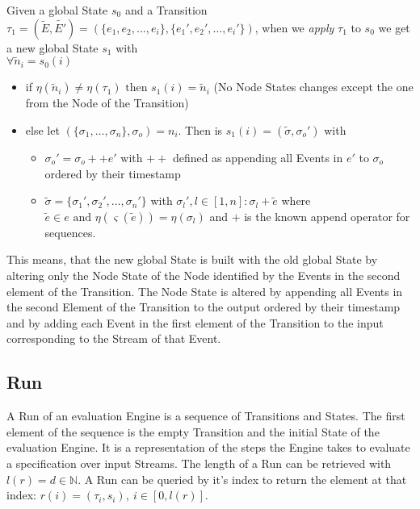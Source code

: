 \begin{definition}[name = Application of a Transition on a State]\label{sec:concepts:def:application_transition}
  Given a global State \(s_0\) and a Transition \(\tau_1 = (\widetilde{E}, \widetilde{E'}) = (\{e_1,e_2,\dots,e_i\}, \{e_1',e_2',\dots,e_i'\})\), when we \emph{apply} \(\tau_1\) to \(s_0\) we get a new global State \(s_1\) with\\
  \(\forall \widetilde{n}_i = s_0(i)\)
  \begin{itemize}
    \item if \(\eta(\widetilde{n}_i) \neq \eta(\tau_1) \text{ then } s_1(i) = \widetilde{n}_i\) (No Node States changes except the one from the Node of the Transition)
    \item else let \((\{\sigma_1,\dots,\sigma_n\}, \sigma_o) = n_i\). Then is \(s_1(i) = (\widetilde{\sigma}, \sigma_o')\) with
      \begin{itemize}
        \item \(\sigma_o' = \sigma_o ++ e'\) with \(++\) defined as appending all Events in \(e'\) to \(\sigma_o\) ordered by their timestamp
        \item \(\widetilde{\sigma} = \{\sigma_1', \sigma_2', \dots, \sigma_n'\}\) with \(\sigma_l', l \in [1,n]: \sigma_l + \widetilde{e}\) where \(\widetilde{e} \in e \text{ and } \eta(\varsigma(\widetilde{e})) = \eta(\sigma_l)\) and \(+\) is the known append operator for sequences.
      \end{itemize}
  \end{itemize}

\end{definition}
This means, that the new global State is built with the old global State by altering only the Node State of the Node identified by the Events in the second element of the Transition.
The Node State is altered by appending all Events in the second Element of the Transition to the output ordered by their timestamp and by adding each Event in the first element of the Transition to the input corresponding to the Stream of that Event.

\subsection{Run}
\label{sec:concepts:def:run}

A Run of an evaluation Engine is a sequence of Transitions and States.
The first element of the sequence is the empty Transition and the initial State of the evaluation Engine.
It is a representation of the steps the Engine takes to evaluate a specification over input Streams.
The length of a Run can be retrieved with \(l(r) = d \in \mathbb{N}\).
A Run can be queried by it's index to return the element at that index: \(r(i)=(\tau_i, s_i),\ i \in [0, l(r)]\).

